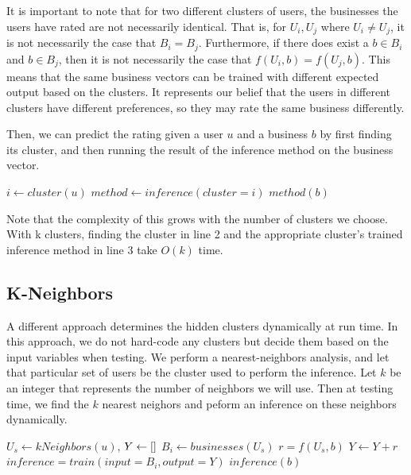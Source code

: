 \documentclass[11pt]{article}
\begin{document}
It is important to note that for two different clusters of users, the businesses the users have rated are not necessarily identical. That is, for $U_i, U_j$ where $U_i \neq U_j$, it is not necessarily the case that $B_i = B_j$. Furthermore, if there does exist a $b \in B_i$ and $b \in B_j$, then it is not necessarily the case that $f(U_i, b) = f(U_j, b)$. This means that the same business vectors can be trained with different expected output based on the clusters. It represents our belief that the users in different clusters have different preferences, so they may rate the same business differently. 

Then, we can predict the rating given a user $u$ and a business $b$ by first finding its cluster, and then running the result of the inference method on the business vector.\\

\begin{algorithmic}[1]
\State $i \gets cluster(u)$ 
\State $method \gets inference(cluster=i)$ 
\State \Return $method(b)$
\EndFunction
\end{algorithmic}
\medskip

Note that the complexity of this grows with the number of clusters we choose. With k clusters, finding the cluster in line 2 and the appropriate cluster's trained inference method in line 3 take $O(k)$ time.

\subsection{K-Neighbors}
A different approach determines the hidden clusters dynamically at run time. In this approach, we do not hard-code any clusters but decide them based on the input variables when testing. We perform a nearest-neighbors analysis, and let that particular set of users be the cluster used to perform the inference. Let $k$ be an integer that represents the number of neighbors we will use. Then at testing time, we find the $k$ nearest neighors and peform an inference on these neighbors dynamically.\\

\begin{algorithmic}[1]
\State $U_s \gets kNeighbors(u)$, $Y \gets \small[ \small]$
\State $B_i \gets businesses(U_s)$ 
\State $r = f(U_s, b)$ 
\State $Y \gets Y + r$
\EndFor
\State $inference = train(input=B_i, output=Y)$ 
\State \Return $inference(b)$
\EndFunction
\end{algorithmic}
\medskip
\end{document}
